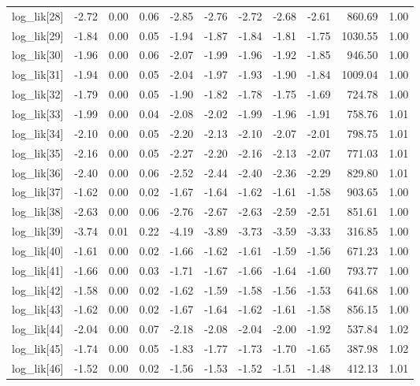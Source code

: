 \begin{table}[ht]
\begin{tabular}{rrrrrrrrrrr}
  log\_lik[28] & -2.72 & 0.00 & 0.06 & -2.85 & -2.76 & -2.72 & -2.68 & -2.61 & 860.69 & 1.00 \\ 
  log\_lik[29] & -1.84 & 0.00 & 0.05 & -1.94 & -1.87 & -1.84 & -1.81 & -1.75 & 1030.55 & 1.00 \\ 
  log\_lik[30] & -1.96 & 0.00 & 0.06 & -2.07 & -1.99 & -1.96 & -1.92 & -1.85 & 946.50 & 1.00 \\ 
  log\_lik[31] & -1.94 & 0.00 & 0.05 & -2.04 & -1.97 & -1.93 & -1.90 & -1.84 & 1009.04 & 1.00 \\ 
  log\_lik[32] & -1.79 & 0.00 & 0.05 & -1.90 & -1.82 & -1.78 & -1.75 & -1.69 & 724.78 & 1.00 \\ 
  log\_lik[33] & -1.99 & 0.00 & 0.04 & -2.08 & -2.02 & -1.99 & -1.96 & -1.91 & 758.76 & 1.01 \\ 
  log\_lik[34] & -2.10 & 0.00 & 0.05 & -2.20 & -2.13 & -2.10 & -2.07 & -2.01 & 798.75 & 1.01 \\ 
  log\_lik[35] & -2.16 & 0.00 & 0.05 & -2.27 & -2.20 & -2.16 & -2.13 & -2.07 & 771.03 & 1.01 \\ 
  log\_lik[36] & -2.40 & 0.00 & 0.06 & -2.52 & -2.44 & -2.40 & -2.36 & -2.29 & 829.80 & 1.01 \\ 
  log\_lik[37] & -1.62 & 0.00 & 0.02 & -1.67 & -1.64 & -1.62 & -1.61 & -1.58 & 903.65 & 1.00 \\ 
  log\_lik[38] & -2.63 & 0.00 & 0.06 & -2.76 & -2.67 & -2.63 & -2.59 & -2.51 & 851.61 & 1.00 \\ 
  log\_lik[39] & -3.74 & 0.01 & 0.22 & -4.19 & -3.89 & -3.73 & -3.59 & -3.33 & 316.85 & 1.00 \\ 
  log\_lik[40] & -1.61 & 0.00 & 0.02 & -1.66 & -1.62 & -1.61 & -1.59 & -1.56 & 671.23 & 1.00 \\ 
  log\_lik[41] & -1.66 & 0.00 & 0.03 & -1.71 & -1.67 & -1.66 & -1.64 & -1.60 & 793.77 & 1.00 \\ 
  log\_lik[42] & -1.58 & 0.00 & 0.02 & -1.62 & -1.59 & -1.58 & -1.56 & -1.53 & 641.68 & 1.00 \\ 
  log\_lik[43] & -1.62 & 0.00 & 0.02 & -1.67 & -1.64 & -1.62 & -1.61 & -1.58 & 856.15 & 1.00 \\ 
  log\_lik[44] & -2.04 & 0.00 & 0.07 & -2.18 & -2.08 & -2.04 & -2.00 & -1.92 & 537.84 & 1.02 \\ 
  log\_lik[45] & -1.74 & 0.00 & 0.05 & -1.83 & -1.77 & -1.73 & -1.70 & -1.65 & 387.98 & 1.02 \\ 
  log\_lik[46] & -1.52 & 0.00 & 0.02 & -1.56 & -1.53 & -1.52 & -1.51 & -1.48 & 412.13 & 1.01 \\ 

\end{tabular}
\end{table}
